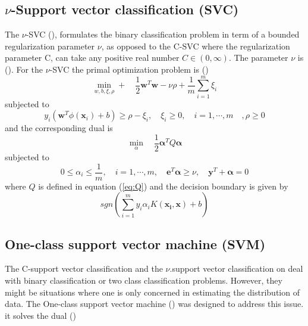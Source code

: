 \documentclass[../Main/thesis.tex]{subfiles}
\begin{document}
\subsection{$\nu$-Support vector classification (SVC)}
The $\nu$-SVC (\cite{kp2000}), formulates the binary classification problem in term of a bounded regularization
 parameter $\nu$, as opposed to the C-SVC where the regularization parameter C, can take any positive real number $C\in (0,\infty)$. The parameter $\nu$ is  (\cite{chang2001}). 
 \justify
 For the $\nu$-SVC the primal optimization problem is (\cite{chang2001})
 \begin{equation}
 \min_{w,b,\xi,\rho} +\quad \frac{1}{2}\bm{w}^{T}\bm{w}- \nu\rho + \frac{1}{m}\sum_{i = 1}^{m}\xi_{i}
 \end{equation}
 subjected to 
 \begin{equation}
 y_{i}(\bm{w}^{T}\phi(\bm{x}_{i}) + b) \geq \rho - \xi_{i}, \quad \xi_{i} \geq 0, \quad i = 1,\cdots,m \quad, \rho \geq 0
 \end{equation}
 and the corresponding dual is 
 \begin{equation}\label{eq:nudual1}
 \min_{\alpha}\quad \frac{1}{2}\bm{\alpha}^{T}Q\bm{\alpha}
 \end{equation}
 subjected to 
 \begin{equation}\label{eq:nudual2}
  0 \leq \alpha_{i} \leq \frac{1}{m},\quad  i = 1,\cdots, m, \quad \bm{e}^{T}\bm{\alpha} \geq \nu, \quad \bm{y}^{T}+\bm{\alpha} = 0
 \end{equation}
 where $Q$ is defined in equation (\ref{eq:Q}) and the decision boundary is given by
 \begin{equation}
 	sgn\left(  \sum_{i=1}^{m}y_{i}\alpha_{i}K(\bm{x_{i}},\bm{x}) +b\right)
 \end{equation}
 
 \subsection{One-class support vector machine (SVM)}
 The C-support vector classification and the $\nu$.support vector classification on deal with binary classification or two class classification problems. However, they might be situations where one is only concerned in estimating the distribution of data. The One-class support vector machine (\cite{kp2001}) was designed to address this issue.
 it solves the dual  (\cite{chang2001})
 
\end{document}
